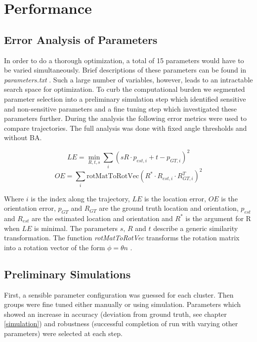 \chapter{Performance}
\label{performance}

\section{Error Analysis of Parameters}

In order to do a thorough optimization, a total of 15 parameters would have to be varied simultaneously. 
Brief descriptions of these parameters can be found in \emph{parameters.txt} .
Such a large number of variables, however, leads to an intractable search space for optimization. 
To curb the computational burden we segmented parameter selection into a preliminary simulation step  which identified sensitive and non-sensitive parameters and a fine tuning step which investigated these parameters further. 
During the analysis the following error metrics were used to compare trajectories. The full analysis was done with fixed angle thresholds and without BA.

\begin{equation*}LE = \underset{R,t,s}{\min} \sum_i (s R \cdot p_{est, i} + t - p_{GT, i})^2\end{equation*}
\begin{equation*}OE = \sum_i \text{rotMatToRotVec}(R^* \cdot R_{est,i} \cdot R_{GT, i}^T)^2\end{equation*}

Where $i$ is the index along the trajectory, $LE$ is the location error, $OE$ is the orientation error, $p_{GT}$ and $R_{GT}$ are the ground truth location and orientation, $p_{est}$ and $R_{est}$ are the estimated location and orientation and $R^*$ is the argument for R when $LE$ is minimal. 
The parameters $s$, $R$ and $t$ describe a generic similarity transformation. 
The function \emph{rotMatToRotVec} transforms the rotation matrix into a rotation vector of the form $\phi = \theta n$ .

\section{Preliminary Simulations}

First, a sensible parameter configuration was guessed for each cluster. 
Then groups were fine tuned either manually or using simulation.  
Parameters which showed an increase in accuracy (deviation from ground truth, see chapter \ref{simulation}) and robustness (successful completion of run with varying other parameters) were selected at each step.

